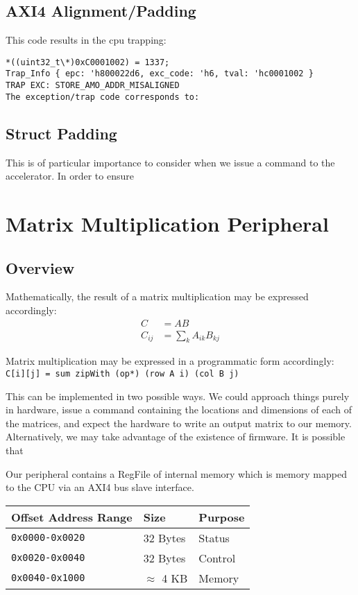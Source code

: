 \documentclass[a4paper,9pt]{report}
\begin{document}
\subsection{AXI4 Alignment/Padding}

This code results in the cpu trapping:
\begin{verbatim}
*((uint32_t\*)0xC0001002) = 1337;
Trap_Info { epc: 'h800022d6, exc_code: 'h6, tval: 'hc0001002 }
TRAP EXC: STORE_AMO_ADDR_MISALIGNED
The exception/trap code corresponds to:
\end{verbatim}

\subsection{Struct Padding}
This is of particular importance to consider when we issue a command to the
accelerator. In order to ensure 

\section{Matrix Multiplication Peripheral}
\subsection{Overview}
Mathematically, the result of a matrix multiplication may be expressed
accordingly:
\begin{align*}
  C &= AB \\
  C_{ij} &= \sum_k A_{ik}B_{kj}
\end{align*}

Matrix multiplication may be expressed in a programmatic form accordingly:
\texttt{C[i][j] = sum zipWith (op*) (row A i) (col B j)}

This can be implemented in two possible ways.
We could approach things purely in hardware, issue a command containing the
locations and dimensions of each of the matrices, and expect the hardware to
write an output matrix to our memory.
Alternatively, we may take advantage of the existence of firmware. It is
possible that 

Our peripheral contains a RegFile of internal memory which is memory mapped to
the CPU via an AXI4 bus slave interface.

\begin{table}
  \centering
\begin{tabular}{lll}
  \toprule
  Offset Address Range & Size & Purpose \\
  \midrule
  \texttt{0x0000-0x0020} & 32 Bytes & Status \\
  \texttt{0x0020-0x0040} & 32 Bytes & Control \\
  \texttt{0x0040-0x1000} & $\approx$ 4 KB & Memory \\
  \bottomrule
\end{tabular}
\end{table}
\end{document}
